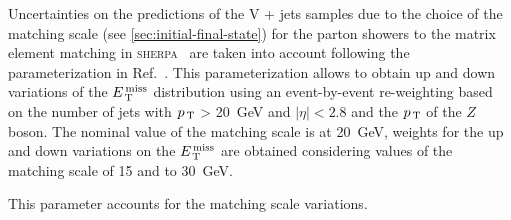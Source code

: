 Uncertainties on the predictions of the V + jets samples due to the choice of
the matching scale (see \cref{sec:initial-final-state}) for the parton showers
to the matrix element matching in \textsc{sherpa}~\cite{SHERPAGenerator} are
taken into account following the parameterization in
Ref.~\cite{VplusJetsModeling}. This parameterization allows to obtain up and
down variations of the $E_\mathrm{\, T}^\mathrm{\, miss}$ distribution using an event-by-event re-weighting
based on the number of jets with $p_\mathrm{\, T}$ > 20~GeV and $|\eta| < 2.8$ and the $p_\mathrm{\, T}$
of the $Z$ boson. The nominal value of the matching scale is at 20~GeV, weights
for the up and down variations on the $E_\mathrm{\, T}^\mathrm{\, miss}$ are obtained considering values of
the matching scale of 15 and to 30~GeV.
\begin{description}[font=\normalfont]
\item[ckkw:] This parameter accounts for the matching scale variations.
\end{description}
